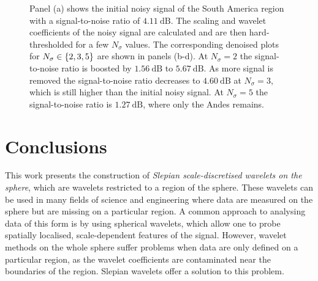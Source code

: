 \begin{figure}[htp]
	\centering
	\hfill
	\newline
	\hfill
	\caption{
		Panel (a) shows the initial noisy signal of the South America region with a signal-to-noise ratio of \(\SI{4.11}{\dB}\).
		The scaling and wavelet coefficients of the noisy signal are calculated and are then hard-thresholded for a few \(N_{\sigma}\) values.
		The corresponding denoised plots for \(N_{\sigma} \in \{2, 3, 5\}\) are shown in panels (b-d).
		At \(N_{\sigma}=2\) the signal-to-noise ratio is boosted by \(\SI{1.56}{\dB}\) to \(\SI{5.67}{\dB}\).
		As more signal is removed the signal-to-noise ratio decreases to \(\SI{4.60}{\dB}\) at \(N_{\sigma}=3\), which is still higher than the initial noisy signal.
		At \(N_{\sigma}=5\) the signal-to-noise ratio is \(\SI{1.27}{\dB}\), where only the Andes remains.
	}\label{fig:chapter3_denoising}
\end{figure}

\section{Conclusions}\label{sec:chapter3_conclusion}

This work presents the construction of \emph{Slepian scale-discretised wavelets on the sphere}, which are wavelets restricted to a region of the sphere.
These wavelets can be used in many fields of science and engineering where data are measured on the sphere but are missing on a particular region.
A common approach to analysing data of this form is by using spherical wavelets, which allow one to probe spatially localised, scale-dependent features of the signal.
However, wavelet methods on the whole sphere suffer problems when data are only defined on a particular region, as the wavelet coefficients are contaminated near the boundaries of the region.
Slepian wavelets offer a solution to this problem.


